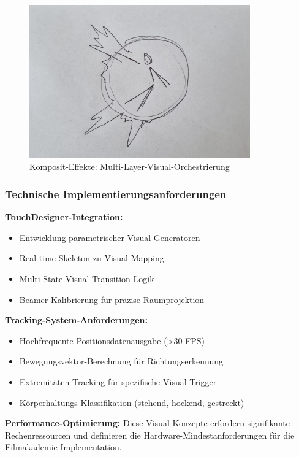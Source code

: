 \begin{figure}[H]
    \centering
    \includegraphics[width=0.85\textwidth]{images/Sprint3_5.jpg}
    \caption{Komposit-Effekte: Multi-Layer-Visual-Orchestrierung}
    \label{fig:composite_effects}
\end{figure}

\subsubsection{Technische Implementierungsanforderungen}

\textbf{TouchDesigner-Integration:}
\begin{itemize}
    \item Entwicklung parametrischer Visual-Generatoren
    \item Real-time Skeleton-zu-Visual-Mapping
    \item Multi-State Visual-Transition-Logik
    \item Beamer-Kalibrierung für präzise Raumprojektion
\end{itemize}

\textbf{Tracking-System-Anforderungen:}
\begin{itemize}
    \item Hochfrequente Positionsdatenausgabe (>30 FPS)
    \item Bewegungsvektor-Berechnung für Richtungserkennung
    \item Extremitäten-Tracking für spezifische Visual-Trigger
    \item Körperhaltungs-Klassifikation (stehend, hockend, gestreckt)
\end{itemize}

\textbf{Performance-Optimierung:}
Diese Visual-Konzepte erfordern signifikante Rechenressourcen und definieren die Hardware-Mindestanforderungen für die Filmakademie-Implementation.

